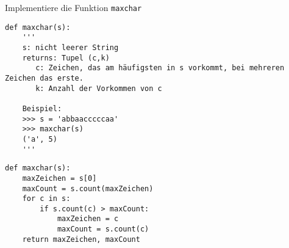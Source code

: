 \question[4]
Implementiere die Funktion \texttt{maxchar}
\begin{lstlisting}
def maxchar(s):
    '''
    s: nicht leerer String
    returns: Tupel (c,k)
       c: Zeichen, das am häufigsten in s vorkommt, bei mehreren Zeichen das erste.
       k: Anzahl der Vorkommen von c

    Beispiel:
    >>> s = 'abbaacccccaa'
    >>> maxchar(s)
    ('a', 5)
    '''
\end{lstlisting}
\begin{solutionbox}{9cm}
\begin{lstlisting}
def maxchar(s):
    maxZeichen = s[0]
    maxCount = s.count(maxZeichen)
    for c in s:
        if s.count(c) > maxCount:
            maxZeichen = c
            maxCount = s.count(c)
    return maxZeichen, maxCount
\end{lstlisting}
\end{solutionbox}
